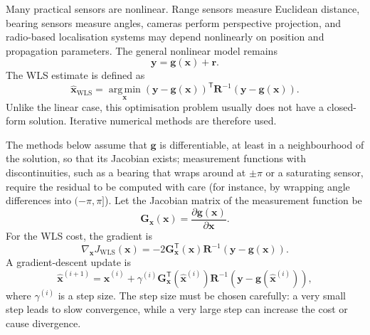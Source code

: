 Many practical sensors are nonlinear. Range sensors measure Euclidean distance, bearing sensors measure angles, cameras perform perspective projection, and radio-based localisation systems may depend nonlinearly on position and propagation parameters. The general nonlinear model remains
\begin{equation}
\mathbf{y} = \mathbf{g}(\mathbf{x}) + \mathbf{r}.
\end{equation}
The WLS estimate is defined as
\begin{equation}
\widehat{\mathbf{x}}_{\mathrm{WLS}} = \operatorname*{arg\,min}_{\mathbf{x}} \left( \mathbf{y} - \mathbf{g}(\mathbf{x}) \right)^{\mathsf T} \mathbf{R}^{-1} \left( \mathbf{y} - \mathbf{g}(\mathbf{x}) \right).
\end{equation}
Unlike the linear case, this optimisation problem usually does not have a closed-form solution. Iterative numerical methods are therefore used.

The methods below assume that $\mathbf{g}$ is differentiable, at least in a neighbourhood of the solution, so that its Jacobian exists; measurement functions with discontinuities, such as a bearing that wraps around at $\pm\pi$ or a saturating sensor, require the residual to be computed with care (for instance, by wrapping angle differences into $(-\pi,\pi]$). Let the Jacobian matrix of the measurement function be
\begin{equation}
\mathbf{G}_{\mathbf{x}}(\mathbf{x}) = \frac{\partial \mathbf{g}(\mathbf{x})}{\partial \mathbf{x}}.
\end{equation}
For the WLS cost, the gradient is
\begin{equation}
\nabla_{\mathbf{x}} J_{\mathrm{WLS}}(\mathbf{x}) = -2 \mathbf{G}_{\mathbf{x}}^{\mathsf T}(\mathbf{x}) \mathbf{R}^{-1} \left(\mathbf{y} - \mathbf{g}(\mathbf{x})\right).
\end{equation}
A gradient-descent update is
\begin{equation}
\widehat{\mathbf{x}}^{(i+1)} = \widehat{\mathbf{x}}^{(i)}+\gamma^{(i)} \mathbf{G}_{\mathbf{x}}^{\mathsf T} \left(\widehat{\mathbf{x}}^{(i)}\right)\mathbf{R}^{-1}\left(\mathbf{y}-\mathbf{g} \left( \widehat{\mathbf{x}}^{(i)} \right)\right),
\end{equation}
where $\gamma^{(i)}$ is a step size. The step size must be chosen carefully: a very small step leads to slow convergence, while a very large step can increase the cost or cause divergence.


